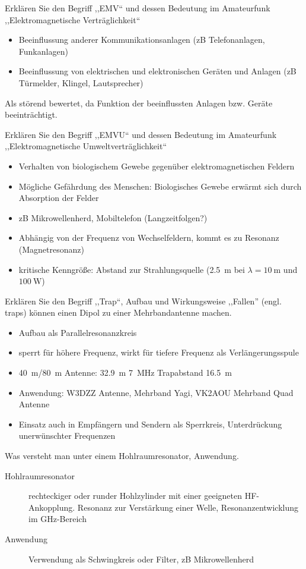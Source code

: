 \documentclass[avery5371,grid,frame,a4paper]{flashcards}
\newcommand{\card}[3]{
  \begin{flashcard}[{\chap} -- #1]{#2}#3\end{flashcard}
}
\begin{document}
\card{87}{Erklären Sie den Begriff ,,EMV`` und dessen Bedeutung im Amateurfunk}{
  ,,Elektromagnetische Verträglichkeit``

  \begin{itemize}
    \item Beeinflussung anderer Kommunikationsanlagen (zB Telefonanlagen, Funkanlagen)
    \item Beeinflussung von elektrischen und elektronischen Geräten und Anlagen (zB Türmelder, Klingel, Lautsprecher)
  \end{itemize}
  Als störend bewertet, da Funktion der beeinflussten Anlagen bzw. Geräte beeinträchtigt.
}
\card{88}{Erklären Sie den Begriff ,,EMVU`` und dessen Bedeutung im Amateurfunk}{
  \small
  ,,Elektromagnetische Umweltverträglichkeit``

  \begin{itemize}
    \item Verhalten von biologischem Gewebe gegenüber elektromagnetischen Feldern
    \item Mögliche Gefährdung des Menschen: Biologisches Gewebe erwärmt sich durch Absorption der Felder
    \item zB Mikrowellenherd, Mobiltelefon (Langzeitfolgen?)
    \item Abhängig von der Frequenz von Wechselfeldern, kommt es zu Resonanz (Magnetresonanz)
    \item kritische Kenngröße: Abstand zur Strahlungsquelle (\SI{2,5}{\metre} bei $\lambda = \SI{10}{\metre}$ und $\SI{100}{\watt}$)
  \end{itemize}
}
\card{89}{Erklären Sie den Begriff ,,Trap``, Aufbau und Wirkungsweise}{
  \small
  ,,Fallen'' (engl. traps) können einen Dipol zu einer Mehrbandantenne machen.
  \begin{itemize}
    \item Aufbau als Parallelresonanzkreis
    \item sperrt für höhere Frequenz, wirkt für tiefere Frequenz als Verlängerungsspule
    \item {\footnotesize \SI{40}{\metre}/\SI{80}{\metre} Antenne: \SI{32,9}{\metre} \SI{7}{\mega\Hz} Trapabstand \SI{16,5}{\metre}}
    \item Anwendung: W3DZZ Antenne, Mehrband Yagi, VK2AOU Mehrband Quad Antenne
    \item Einsatz auch in Empfängern und Sendern als Sperrkreis, Unterdrückung unerwünschter Frequenzen
  \end{itemize}
}
\card{90}{Was versteht man unter einem Hohlraumresonator, Anwendung.}{
  \begin{description}
    \item[Hohlraumresonator]
      rechteckiger oder runder Hohlzylinder mit einer geeigneten HF-Ankopplung.
      Resonanz zur Verstärkung einer Welle,
      Resonanzentwicklung im GHz-Bereich
    \item[Anwendung]
      Verwendung als Schwingkreis oder Filter, zB Mikrowellenherd
  \end{description}
}
\end{document}
